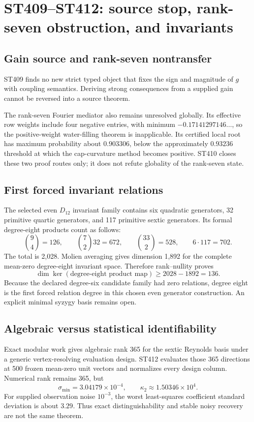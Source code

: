\documentclass[11pt,a4paper]{article}
\begin{document}
\section{ST409--ST412: source stop, rank-seven obstruction, and invariants}

\subsection{Gain source and rank-seven nontransfer}

ST409 finds no new strict typed object that fixes the sign and magnitude of $g$ with
coupling semantics.  Deriving strong consequences from a supplied gain cannot be
reversed into a source theorem.

The rank-seven Fourier mediator also remains unresolved globally.  Its effective row
weights include four negative entries, with minimum $-0.17141297146\ldots$, so the
positive-weight water-filling theorem is inapplicable.  Its certified local root has
maximum probability about $0.903306$, below the approximately $0.93236$ threshold
at which the cap-curvature method becomes positive.  ST410 closes these two proof
routes only; it does not refute globality of the rank-seven state.

\subsection{First forced invariant relations}

The selected even $D_{12}$ invariant family contains six quadratic generators,
32 primitive quartic generators, and 117 primitive sextic generators.  Its formal
degree-eight products count as follows:
\[
 \binom{9}{4}=126,\qquad
 \binom{7}{2}32=672,\qquad
 \binom{33}{2}=528,\qquad
 6\cdot117=702.
\]
The total is 2,028.  Molien averaging gives dimension 1,892 for the complete
mean-zero degree-eight invariant space.  Therefore rank--nullity proves
\[
 \dim\ker(\text{degree-eight product map})\ge2028-1892=136.
\]
Because the declared degree-six candidate family had zero relations, degree eight
is the first forced relation degree in this chosen even generator construction.
An explicit minimal syzygy basis remains open.

\subsection{Algebraic versus statistical identifiability}

Exact modular work gives algebraic rank 365 for the sextic Reynolds basis under a
generic vertex-resolving evaluation design.  ST412 evaluates those 365 directions
at 500 frozen mean-zero unit vectors and normalizes every design column.  Numerical
rank remains 365, but
\[
 \sigma_{\min}=3.04179\times10^{-4},\qquad
 \kappa_2\approx1.50346\times10^4.
\]
For supplied observation noise $10^{-3}$, the worst least-squares coefficient
standard deviation is about $3.29$.  Thus exact distinguishability and stable noisy
recovery are not the same theorem.
\end{document}
